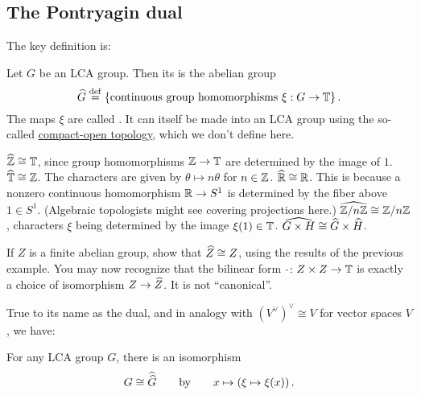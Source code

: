 \subsection{The Pontryagin dual}
The key definition is:
\begin{definition}
	Let $G$ be an LCA group.
	Then its  is the abelian group
	\[ \widehat G \overset{\mathrm{def}}{=} \left\{ \text{continuous group homomorphisms }
			\xi : G \to \mathbb T \right\}. \]
	The maps $\xi$ are called .
	It can itself be made into an LCA group
	using the so-called
	\href{https://en.wikipedia.org/wiki/Compact-open_topology}{compact-open topology},
	which we don't define here.
\end{definition}
\begin{example}
	\listhack
	\begin{itemize}
		\ii $\widehat{\mathbb Z} \cong \mathbb T$,
		since group homomorphisms $\mathbb Z \to \mathbb T$ are determined by the image of $1$.
		\ii $\widehat{\mathbb T} \cong \mathbb Z$.
		The characters are given by $\theta \mapsto n\theta$ for $n \in \mathbb Z$.
		\ii $\widehat{\mathbb R} \cong \mathbb R$.
		This is because a nonzero continuous homomorphism
		$\mathbb R \to S^1$ is determined by the fiber above $1 \in S^1$.
		(Algebraic topologists might see covering projections here.)
		\ii $\widehat{\mathbb Z/n\mathbb Z} \cong \mathbb Z/n\mathbb Z$,
		characters $\xi$ being determined by the image $\xi(1) \in \mathbb T$.
		\ii $\widehat{G \times H} \cong \widehat G \times \widehat H$.
	\end{itemize}
\end{example}
\begin{exercise}
	If $Z$ is a finite abelian group, show that $\widehat Z \cong Z$,
	using the results of the previous example.
	You may now recognize that the bilinear form
	$\cdot \colon Z \times Z \to \mathbb T$
	is exactly a choice of isomorphism $Z \to \widehat Z$.
	It is not ``canonical''.
\end{exercise}


True to its name as the dual,
and in analogy with $(V^\vee)^\vee \cong V$ for vector spaces $V$, we have:
\begin{theorem}
	For any LCA group $G$, there is an isomorphism
	\[ G \cong \widehat{\widehat G} \qquad \text{by} \qquad
		x \mapsto \left( \xi \mapsto \xi(x) \right). \]
\end{theorem}

